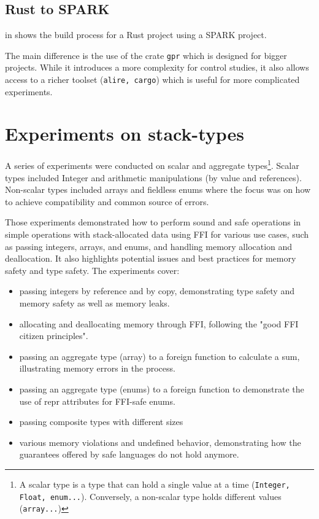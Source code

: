 \documentclass[nomenclature, english, bibtex]{kththesis}
\begin{document}
\subsection{Rust to SPARK}

 in  shows the build process for a Rust project using a SPARK project. 

The main difference is the use of the crate \texttt{gpr} which is designed for bigger projects. While it introduces a more complexity for control studies, it also allows access to a richer toolset (\texttt{alire, cargo}) which is useful for more complicated experiments.  

\section{Experiments on stack-types}

A series of experiments were conducted on scalar and aggregate types\footnote{A scalar type is a type that can hold a single value at a time (\texttt{Integer, Float, enum...}). Conversely, a non-scalar type holds different values (\texttt{array...})}. Scalar types included Integer and arithmetic manipulations (by value and references). Non-scalar types included arrays and fieldless enums where the focus was on how to achieve compatibility and common source of errors.

Those experiments demonstrated how to perform sound and safe operations in simple operations with stack-allocated data using \gls{FFI} for various use cases, such as passing integers, arrays, and enums, and handling memory allocation and deallocation. It also highlights potential issues and best practices for memory safety and type safety. The experiments cover:

\begin{itemize}
    \item passing integers by reference and by copy, demonstrating type safety and memory safety as well as memory leaks.
    \item allocating and deallocating memory through FFI, following the "good FFI citizen principles".
    \item passing an aggregate type (array) to a foreign function to calculate a sum, illustrating memory errors in the process.
     \item passing an aggregate type (enums) to a foreign function to demonstrate the use of repr attributes for FFI-safe enums.
     \item passing composite types with different sizes
     \item various memory violations and undefined behavior, demonstrating how the guarantees offered by safe languages do not hold anymore.
\end{itemize}
 
\end{document}
